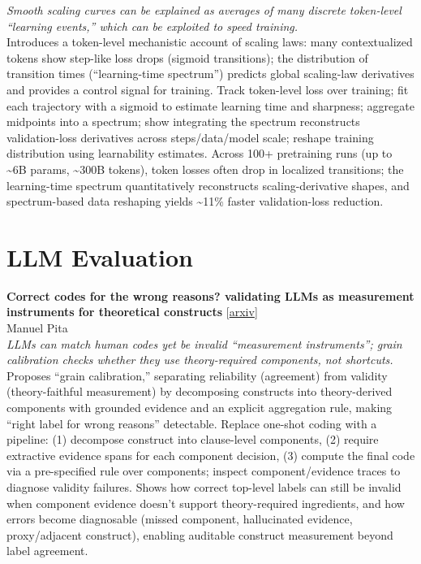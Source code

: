 \documentclass[12pt,letterpaper]{article}
\begin{document}
{\small\textit{Smooth scaling curves can be explained as averages of many discrete token-level ``learning events,'' which can be exploited to speed training.}}\\[1pt]
{\footnotesize Introduces a token-level mechanistic account of scaling laws: many contextualized tokens show step-like loss drops (sigmoid transitions); the distribution of transition times (``learning-time spectrum'') predicts global scaling-law derivatives and provides a control signal for training. Track token-level loss over training; fit each trajectory with a sigmoid to estimate learning time and sharpness; aggregate midpoints into a spectrum; show integrating the spectrum reconstructs validation-loss derivatives across steps/data/model scale; reshape training distribution using learnability estimates. Across 100+ pretraining runs (up to \textasciitilde{}6B params, \textasciitilde{}300B tokens), token losses often drop in localized transitions; the learning-time spectrum quantitatively reconstructs scaling-derivative shapes, and spectrum-based data reshaping yields \textasciitilde{}11\% faster validation-loss reduction.}

\medskip


\section*{LLM Evaluation}

{\small\textbf{Correct codes for the wrong reasons? validating LLMs as measurement instruments for theoretical constructs}} {\scriptsize[\href{https://arxiv.org/abs/2606.28574}{arxiv}]}\\
{\scriptsize Manuel Pita}\\

{\small\textit{LLMs can match human codes yet be invalid ``measurement instruments''; grain calibration checks whether they use theory-required components, not shortcuts.}}\\[1pt]
{\footnotesize Proposes ``grain calibration,'' separating reliability (agreement) from validity (theory-faithful measurement) by decomposing constructs into theory-derived components with grounded evidence and an explicit aggregation rule, making ``right label for wrong reasons'' detectable. Replace one-shot coding with a pipeline: (1) decompose construct into clause-level components, (2) require extractive evidence spans for each component decision, (3) compute the final code via a pre-specified rule over components; inspect component/evidence traces to diagnose validity failures. Shows how correct top-level labels can still be invalid when component evidence doesn't support theory-required ingredients, and how errors become diagnosable (missed component, hallucinated evidence, proxy/adjacent construct), enabling auditable construct measurement beyond label agreement.}
\end{document}
